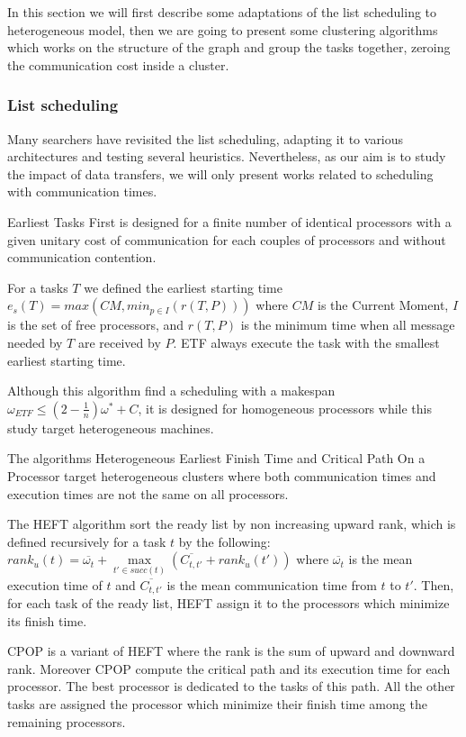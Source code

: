 \documentclass[10pt, conference, compsocconf]{IEEEtran}
\begin{document}
In this section we will first describe some adaptations of the list scheduling
to heterogeneous model, then we are going to present some clustering
algorithms which works on the structure of the graph and group the tasks
together, zeroing the communication cost inside a cluster. 

\subsubsection{List scheduling} \label{sec:soa-sched-list}

Many searchers have revisited the list scheduling, adapting it to various
architectures and testing several heuristics. Nevertheless, as our aim is to
study the impact of data transfers, we will only present works related to
scheduling with communication times.

Earliest Tasks First\cite{hwang1989scheduling} is designed for a finite
number of identical processors with a given unitary cost of communication
for each couples of processors and without communication contention.

For a tasks $T$ we defined the earliest starting time
$e_s(T)=max(CM,min_{p\in I}(r(T,P)))$ where $CM$ is the Current Moment, $I$
is the set of free processors, and $r(T,P)$ is the minimum time when all
message needed by $T$ are received by $P$. ETF always execute the task with
the smallest earliest starting time. 

Although this algorithm find a scheduling with a makespan $\omega_{ETF} \leq
(2-\frac{1}{n})\omega^{*}+C$, it is designed for homogeneous processors while
this study target heterogeneous machines.

The algorithms Heterogeneous Earliest Finish Time  and Critical Path On a
Processor\cite{topcuoglu2002performance} target heterogeneous clusters where
both communication times and execution times are not the same on all
processors. 

The HEFT algorithm sort the ready list by non increasing upward rank, which
is defined recursively for a task $t$ by the following:\\
$rank_u(t)=\overline{\omega_{t}}+\max\limits_{t' \in
succ(t)}(\overline{C_{t,t'}}+rank_u(t'))$ where $\overline{\omega_{t}}$ is
the mean execution time of $t$ and $\overline{C_{t,t'}}$ is the mean
communication time from $t$ to $t'$. Then, for each task of the ready list,
HEFT assign it to the processors which minimize its finish time. 

CPOP is a variant of HEFT where the rank is the sum of upward and downward
rank. Moreover CPOP compute the critical path and its execution time for each
processor. The best processor is dedicated to the tasks of this path. All the
other tasks are assigned the processor which minimize their finish time among
the remaining processors.
\end{document}
